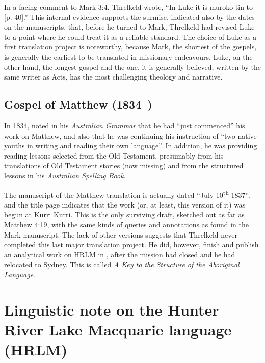 {In a facing comment to Mark 3:4, Threlkeld wrote, “In Luke it is muroko tin to [p. 40].” This internal evidence supports the surmise, indicated also by the dates on the manuscripts, that, before he turned to Mark, Threlkeld had revised Luke to a point where he could treat it as a reliable standard. The choice of Luke as a first translation project is noteworthy, because Mark, the shortest of the gospels, is generally the earliest to be translated in missionary endeavours. Luke, on the other hand, the longest gospel and the one, it is generally believed, written by the same writer as Acts, has the most challenging theology and narrative.

\subsection{Gospel of Matthew (1834--)}

In 1834, \citeauthor{threlkeld_australian_1834} noted in his \textit{Australian Grammar} that he had “just commenced” his work on Matthew, and also that he was continuing his instruction of “two native youths in writing and reading their own language”. In addition, he was providing reading lessons selected from the Old Testament, presumably from his translations of Old Testament stories (now missing) and from the structured lessons in his \textit{Australian Spelling Book}.

The manuscript of the Matthew translation is actually dated “July 10\textsuperscript{th} 1837”, and the title page indicates that the work (or, at least, this version of it) was begun at Kurri Kurri. This is the only surviving draft, sketched out as far as Matthew 4:19, with the same kinds of queries and annotations as found in the Mark manuscript. The lack of other versions suggests that Threlkeld never completed this last major translation project. He did, however, finish and publish an analytical work on HRLM in \citeyear{threlkeld_key_1850}, after the mission had closed and he had relocated to Sydney. This is called \textit{A Key to the Structure of the Aboriginal Language}.

\section{Linguistic note on the Hunter River Lake Macquarie language (HRLM)}

}
